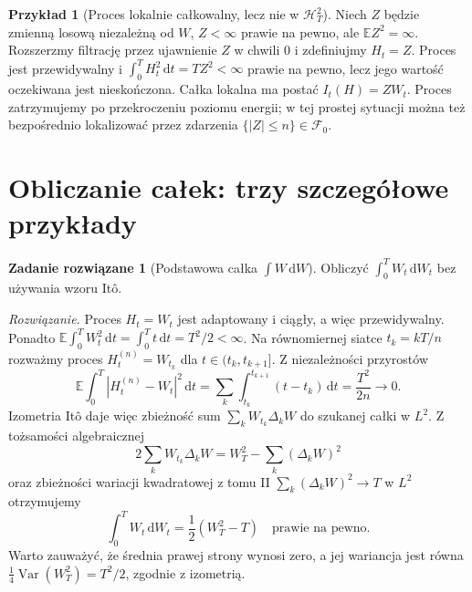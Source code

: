 \documentclass[11pt,a4paper,oneside]{report}
\numberwithin{equation}{chapter}
\theoremstyle{plain}
\theoremstyle{definition}
\newtheorem{przyklad}{Przykład}[chapter]
\newtheorem{zadanie}{Zadanie rozwiązane}[chapter]
\theoremstyle{remark}
\newcommand{\E}{\mathbb{E}}
\newcommand{\Var}{\operatorname{Var}}
\newcommand{\calF}{\mathcal{F}}
\newcommand{\calH}{\mathcal{H}}
\newcommand{\dd}{\mathrm{d}}
\begin{document}
\begin{przyklad}[Proces lokalnie całkowalny, lecz nie w $\calH_T^2$]
Niech $Z$ będzie zmienną losową niezależną od $W$,
$Z<\infty$ prawie na pewno, ale $\E Z^2=\infty$.
Rozszerzmy filtrację przez ujawnienie $Z$ w chwili $0$
i zdefiniujmy $H_t=Z$. Proces jest przewidywalny i
$\int_0^TH_t^2\,\dd t=TZ^2<\infty$ prawie na pewno,
lecz jego wartość oczekiwana jest nieskończona.
Całka lokalna ma postać $I_t(H)=ZW_t$.
Proces zatrzymujemy po przekroczeniu poziomu energii;
w tej prostej sytuacji można też bezpośrednio lokalizować
przez zdarzenia $\{|Z|\le n\}\in\calF_0$.
\end{przyklad}

\section{Obliczanie całek: trzy szczegółowe przykłady}
\begin{zadanie}[Podstawowa całka $\int W\,\dd W$]\label{zad:W-dW}
Obliczyć $\int_0^T W_t\,\dd W_t$ bez używania wzoru Itô.

\emph{Rozwiązanie.}
Proces $H_t=W_t$ jest adaptowany i ciągły,
a więc przewidywalny. Ponadto
$\E\int_0^TW_t^2\,\dd t=\int_0^Tt\,\dd t=T^2/2<\infty$.
Na równomiernej siatce $t_k=kT/n$ rozważmy proces
$H_t^{(n)}=W_{t_k}$ dla $t\in(t_k,t_{k+1}]$.
Z niezależności przyrostów
\[
\E\int_0^T|H_t^{(n)}-W_t|^2\,\dd t
=\sum_k\int_{t_k}^{t_{k+1}}(t-t_k)\,\dd t
=\frac{T^2}{2n}\longrightarrow0.
\]
Izometria Itô daje więc zbieżność sum
$\sum_kW_{t_k}\Delta_kW$ do szukanej całki w $L^2$.
Z tożsamości algebraicznej
\[
2\sum_kW_{t_k}\Delta_kW
=W_T^2-\sum_k(\Delta_kW)^2
\]
oraz zbieżności wariacji kwadratowej z tomu II
$\sum_k(\Delta_kW)^2\to T$ w $L^2$ otrzymujemy
\[
\int_0^TW_t\,\dd W_t=\frac12(W_T^2-T)
\quad\text{prawie na pewno}.
\tag{2.13}\label{eq:W-dW}
\]
Warto zauważyć, że średnia prawej strony wynosi zero,
a jej wariancja jest równa
$\frac14\Var(W_T^2)=T^2/2$, zgodnie z izometrią.
\end{zadanie}
\end{document}
